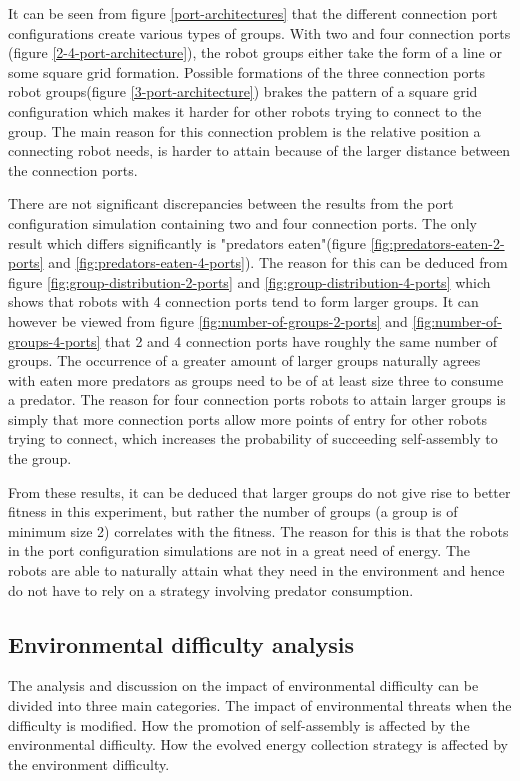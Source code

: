 It can be seen from figure \ref{port-architectures} that the different connection port configurations create various types of groups. 
With two and four connection ports (figure \ref{2-4-port-architecture}), the robot groups either take the form of a line or some square grid formation.
Possible formations of the three connection ports robot groups(figure \ref{3-port-architecture}) brakes the pattern of a square grid configuration which makes it harder for other robots trying to connect to the group.
The main reason for this connection problem is the relative position a connecting robot needs, is harder to attain because of the larger distance between the connection ports.

There are not significant discrepancies between the results from the port configuration simulation containing two and four connection ports.
The only result which differs significantly is "predators eaten"(figure \ref{fig:predators-eaten-2-ports} and \ref{fig:predators-eaten-4-ports}).
The reason for this can be deduced from figure \ref{fig:group-distribution-2-ports} and \ref{fig:group-distribution-4-ports} which shows that robots with 4 connection ports tend to form larger groups.
It can however be viewed from figure \ref{fig:number-of-groups-2-ports} and \ref{fig:number-of-groups-4-ports} that 2 and 4 connection ports have roughly the same number of groups.
The occurrence of a greater amount of larger groups naturally agrees with eaten more predators as groups need to be of at least size three to consume a predator.
The reason for four connection ports robots to attain larger groups is simply that more connection ports allow more points of entry for other robots trying to connect, which increases the probability of succeeding self-assembly to the group.

From these results, it can be deduced that larger groups do not give rise to better fitness in this experiment, but rather the number of groups (a group is of minimum size 2) correlates with the fitness.
The reason for this is that the robots in the port configuration simulations are not in a great need of energy.
The robots are able to naturally attain what they need in the environment and hence do not have to rely on a strategy involving predator consumption.

\subsection{Environmental difficulty analysis}
The analysis and discussion on the impact of environmental difficulty can be divided into three main categories.
The impact of environmental threats when the difficulty is modified.
How the promotion of self-assembly is affected by the environmental difficulty.
How the evolved energy collection strategy is affected by the environment difficulty.	

